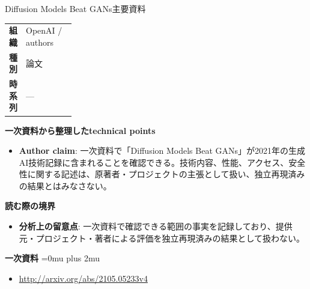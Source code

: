 \begin{technicalnote}{Diffusion Models Beat GANs}{主要資料}
\begingroup
\begin{tabularx}{\linewidth}{@{}>{\bfseries}p{0.22\linewidth}X@{}}
組織 & OpenAI / authors \\
種別 & 論文 \\
時系列 & — \\
\end{tabularx}
\smallskip
{\bfseries 一次資料から整理したtechnical points}
\begin{itemize}[leftmargin=1.5em,itemsep=0.35em]
\item \textbf{Author claim}: 一次資料で「Diffusion Models Beat GANs」が2021年の生成AI技術記録に含まれることを確認できる。技術内容、性能、アクセス、安全性に関する記述は、原著者・プロジェクトの主張として扱い、独立再現済みの結果とはみなさない。
\end{itemize}
\begin{minipage}{\linewidth}
{\bfseries 読む際の境界}
\begin{itemize}[leftmargin=1.5em,itemsep=0.35em]
\item \textbf{分析上の留意点}: 一次資料で確認できる範囲の事実を記録しており、提供元・プロジェクト・著者による評価を独立再現済みの結果として扱わない。
\end{itemize}
\begin{samepage}
{\bfseries 一次資料}
\begingroup\sloppy
\Urlmuskip=0mu plus 2mu\relax
\begin{itemize}[leftmargin=1.5em,itemsep=0.25em]
\item {\scriptsize\url{http://arxiv.org/abs/2105.05233v4}}
\end{itemize}
\endgroup
\end{samepage}
\end{minipage}
\endgroup
\end{technicalnote}
\medskip

